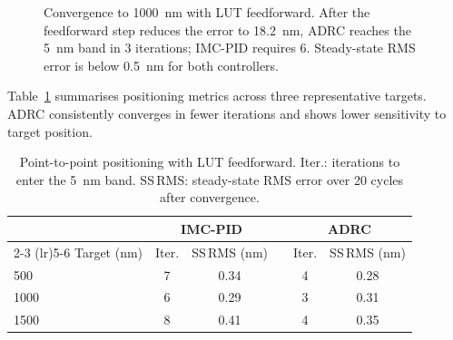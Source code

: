 \documentclass[fleqn,10pt]{wlscirep}
\begin{document}
\begin{figure}[ht]
    \centering
    \caption{Convergence to \SI{1000}{nm} with LUT feedforward. After the feedforward step reduces the error to \SI{18.2}{nm}, ADRC reaches the \SI{5}{nm} band in 3 iterations; IMC-PID requires 6. Steady-state RMS error is below \SI{0.5}{nm} for both controllers.}
    \label{fig:conv}
\end{figure}

Table~\ref{tab:positioning} summarises positioning metrics across three representative targets. ADRC consistently converges in fewer iterations and shows lower sensitivity to target position.

\begin{table}[ht]
    \centering
    \caption{Point-to-point positioning with LUT feedforward. Iter.: iterations to enter the \SI{5}{nm} band. SS\,RMS: steady-state RMS error over 20 cycles after convergence.}
    \label{tab:positioning}
    \begin{tabular}{lccccc}
        \toprule
        & \multicolumn{2}{c}{IMC-PID} & & \multicolumn{2}{c}{ADRC} \\
        \cmidrule(lr){2-3} \cmidrule(lr){5-6}
        Target (nm) & Iter. & SS\,RMS (nm) & & Iter. & SS\,RMS (nm) \\
        \midrule
        500   & 7 & 0.34 & & 4 & 0.28 \\
        1000  & 6 & 0.29 & & 3 & 0.31 \\
        1500  & 8 & 0.41 & & 4 & 0.35 \\
        \bottomrule
    \end{tabular}
\end{table}
\end{document}
